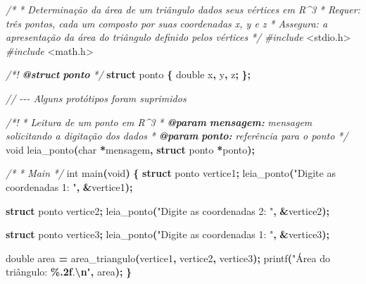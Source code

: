 \documentclass[
  11pt,
  a4paper,
]{scrbook}
\newenvironment{Shaded}{\begin{snugshade}}{\end{snugshade}}
\newcommand{\AnnotationTok}[1]{\textcolor[rgb]{0.56,0.35,0.01}{\textbf{\textit{#1}}}}
\newcommand{\CommentTok}[1]{\textcolor[rgb]{0.56,0.35,0.01}{\textit{#1}}}
\newcommand{\CommentVarTok}[1]{\textcolor[rgb]{0.56,0.35,0.01}{\textbf{\textit{#1}}}}
\newcommand{\DataTypeTok}[1]{\textcolor[rgb]{0.13,0.29,0.53}{#1}}
\newcommand{\ImportTok}[1]{#1}
\newcommand{\KeywordTok}[1]{\textcolor[rgb]{0.13,0.29,0.53}{\textbf{#1}}}
\newcommand{\NormalTok}[1]{#1}
\newcommand{\OperatorTok}[1]{\textcolor[rgb]{0.81,0.36,0.00}{\textbf{#1}}}
\newcommand{\PreprocessorTok}[1]{\textcolor[rgb]{0.56,0.35,0.01}{\textit{#1}}}
\newcommand{\SpecialCharTok}[1]{\textcolor[rgb]{0.81,0.36,0.00}{\textbf{#1}}}
\newcommand{\StringTok}[1]{\textcolor[rgb]{0.31,0.60,0.02}{#1}}
\begin{document}
\begin{Shaded}
\begin{Highlighting}[]
\CommentTok{/*}
\CommentTok{ * Determinação da área de um triângulo dados seus vértices em R\^{}3}
\CommentTok{ * Requer: três pontos, cada um composto por suas coordenadas x, y e z}
\CommentTok{ * Assegura: a apresentação da área do triângulo definido pelos vértices}
\CommentTok{ */}
\PreprocessorTok{\#include }\ImportTok{\textless{}stdio.h\textgreater{}}
\PreprocessorTok{\#include }\ImportTok{\textless{}math.h\textgreater{}}

\CommentTok{/*! }\AnnotationTok{@struct}\CommentTok{ }\CommentVarTok{ponto}\CommentTok{ */}
\KeywordTok{struct}\NormalTok{ ponto }\OperatorTok{\{}
    \DataTypeTok{double}\NormalTok{ x}\OperatorTok{,}\NormalTok{ y}\OperatorTok{,}\NormalTok{ z}\OperatorTok{;}
\OperatorTok{\};}

\CommentTok{// {-}{-}{-} Alguns protótipos foram suprimidos}

\CommentTok{/*!}
\CommentTok{ * Leitura de um ponto em R\^{}3}
\CommentTok{ * }\AnnotationTok{@param}\CommentTok{ }\CommentVarTok{mensagem:}\CommentTok{ mensagem solicitando a digitação dos dados}
\CommentTok{ * }\AnnotationTok{@param}\CommentTok{ }\CommentVarTok{ponto:}\CommentTok{ referência para o ponto}
\CommentTok{ */}
\DataTypeTok{void}\NormalTok{ leia\_ponto}\OperatorTok{(}\DataTypeTok{char} \OperatorTok{*}\NormalTok{mensagem}\OperatorTok{,} \KeywordTok{struct}\NormalTok{ ponto }\OperatorTok{*}\NormalTok{ponto}\OperatorTok{);}

\CommentTok{/*}
\CommentTok{ * Main}
\CommentTok{ */}
\DataTypeTok{int}\NormalTok{ main}\OperatorTok{(}\DataTypeTok{void}\OperatorTok{)} \OperatorTok{\{}
    \KeywordTok{struct}\NormalTok{ ponto vertice1}\OperatorTok{;}
\NormalTok{    leia\_ponto}\OperatorTok{(}\StringTok{"Digite as coordenadas 1: "}\OperatorTok{,} \OperatorTok{\&}\NormalTok{vertice1}\OperatorTok{);}

    \KeywordTok{struct}\NormalTok{ ponto vertice2}\OperatorTok{;}
\NormalTok{    leia\_ponto}\OperatorTok{(}\StringTok{"Digite as coordenadas 2: "}\OperatorTok{,} \OperatorTok{\&}\NormalTok{vertice2}\OperatorTok{);}

    \KeywordTok{struct}\NormalTok{ ponto vertice3}\OperatorTok{;}
\NormalTok{    leia\_ponto}\OperatorTok{(}\StringTok{"Digite as coordenadas 1: "}\OperatorTok{,} \OperatorTok{\&}\NormalTok{vertice3}\OperatorTok{);}

    \DataTypeTok{double}\NormalTok{ area }\OperatorTok{=}\NormalTok{ area\_triangulo}\OperatorTok{(}\NormalTok{vertice1}\OperatorTok{,}\NormalTok{ vertice2}\OperatorTok{,}\NormalTok{ vertice3}\OperatorTok{);}
\NormalTok{    printf}\OperatorTok{(}\StringTok{"Área do triângulo: }\SpecialCharTok{\%.2f}\StringTok{.}\SpecialCharTok{\textbackslash{}n}\StringTok{"}\OperatorTok{,}\NormalTok{ area}\OperatorTok{);}
\OperatorTok{\}}


\end{Highlighting}
\end{Shaded}
\end{document}
